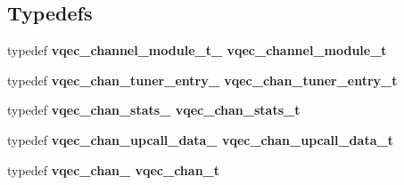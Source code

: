 \subsection*{Typedefs}
\begin{CompactItemize}
\item 
typedef \bf{vqec\_\-channel\_\-module\_\-t\_\-} \bf{vqec\_\-channel\_\-module\_\-t}
\item 
typedef \bf{vqec\_\-chan\_\-tuner\_\-entry\_\-} \bf{vqec\_\-chan\_\-tuner\_\-entry\_\-t}
\item 
typedef \bf{vqec\_\-chan\_\-stats\_\-} \bf{vqec\_\-chan\_\-stats\_\-t}
\item 
typedef \bf{vqec\_\-chan\_\-upcall\_\-data\_\-} \bf{vqec\_\-chan\_\-upcall\_\-data\_\-t}
\item 
typedef \bf{vqec\_\-chan\_\-} \bf{vqec\_\-chan\_\-t}
\end{CompactItemize}

